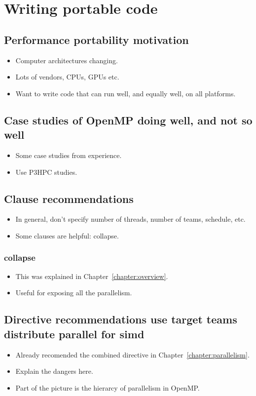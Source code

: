 

\chapter{Writing portable code}
\label{chapter:portable}

\section{Performance portability motivation}
\begin{itemize}
  \item Computer architectures changing.
  \item Lots of vendors, CPUs, GPUs etc.
  \item Want to write code that can run well, and equally well, on all platforms.
\end{itemize}

\section{Case studies of OpenMP doing well, and not so well}
\begin{itemize}
  \item Some case studies from experience.
  \item Use P3HPC studies.
\end{itemize}

\section{Clause recommendations}
\begin{itemize}
  \item In general, don't specify number of threads, number of teams, schedule, etc.
  \item Some clauses are helpful: collapse.
\end{itemize}

\subsection{collapse}
\begin{itemize}
  \item This was explained in Chapter~\ref{chapter:overview}.
  \item Useful for exposing all the parallelism.
\end{itemize}


\section{Directive recommendations use target teams distribute parallel for simd}
\begin{itemize}
  \item Already recomended the combined directive in Chapter~\ref{chapter:parallelism}.
  \item Explain the dangers here.
  \item Part of the picture is the hierarcy of parallelism in OpenMP.
\end{itemize}

